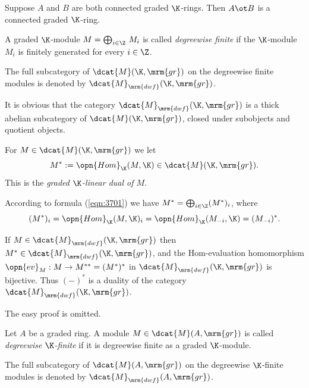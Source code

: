 \begin{exa} \label{exa:3775}
Suppose $A$ and $B$ are both connected graded $\K$-rings. Then 
$A \ot B$ is a connected graded $\K$-ring.
\end{exa}

\begin{dfn} \label{dfn:3724}
A graded $\K$-module $M = \bigoplus_{i \in \Z} \, M_i$ 
is called {\em degreewise finite} 
if the $\K$-module $M_i$ is finitely generated for every $i \in \Z$. 

The full subcategory of $\dcat{M}(\K, \mrm{gr})$ on the 
degreewise finite modules is denoted by 
$\dcat{M}_{\mrm{dwf}}(\K, \mrm{gr})$. 
\end{dfn}

It is obvious that the category $\dcat{M}_{\mrm{dwf}}(\K, \mrm{gr})$ is a thick 
abelian subcategory of $\dcat{M}(\K, \mrm{gr})$, 
closed under subobjects and quotient objects.

\begin{dfn} \label{dfn:3725}
For $M \in \dcat{M}(\K, \mrm{gr})$ we let
\[ M^* := \opn{Hom}_{\K}(M, \K) \in \dcat{M}(\K, \mrm{gr}) . \]
This is the {\em graded $\K$-linear dual of $M$}. 
\end{dfn}

According to formula (\ref{eqn:3701}) we have
$M^* = \bigoplus_{i \in \Z} (M^*)_i$, where 
\[ (M^*)_i = \opn{Hom}_{\K}(M, \K)_i = \opn{Hom}_{\K}(M_{-i}, \K) = 
(M_{-i})^* . \]

\begin{lem} \label{lem:3725}
If $M \in \dcat{M}_{\mrm{dwf}}(\K, \mrm{gr})$ then 
$M^* \in \dcat{M}_{\mrm{dwf}}(\K, \mrm{gr})$, 
and the Hom-evaluation homomorphism
$\opn{ev}_M : M \to M^{**} = (M^*)^*$ 
in $\dcat{M}_{\mrm{dwf}}(\K, \mrm{gr})$ is bijective. 
Thus $(-)^*$ is a duality of the category 
$\dcat{M}_{\mrm{dwf}}(\K, \mrm{gr})$.
\end{lem}

The easy proof is omitted. 

\begin{dfn} \label{dfn:3723} 
Let $A$ be a graded ring. 
A module $M \in \dcat{M}(A, \mrm{gr})$ is called {\em degreewise $\K$-finite} 
if it is degreewise finite as a graded $\K$-module. 

The full subcategory of $\dcat{M}(A, \mrm{gr})$ on the degreewise $\K$-finite 
modules is denoted by 
$\dcat{M}_{\mrm{dwf}}(A, \mrm{gr})$.
\end{dfn}

